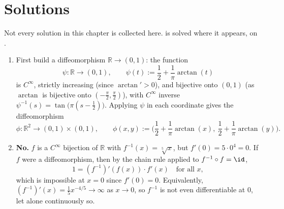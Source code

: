 
\section{Solutions}
\label{sec:ift_solutions}

Not every solution in this chapter is collected here.  is solved
where it appears, on .

\begin{exercisesolution}
\label{sol:diffeomorphism_properties}
\begin{enumerate}[label=\textbf{(\alph*)}]
  \item First build a diffeomorphism $\mathbb{R} \to (0,1)$: the function
    \[\psi : \mathbb{R} \to (0,1), \qquad \psi(t) := \frac12+\frac1\pi\arctan(t)\]
    is $C^\infty$, strictly increasing (since $\arctan' > 0$), and bijective onto $(0,1)$ (as
    $\arctan$ is bijective onto $(-\tfrac\pi2,\tfrac\pi2)$), with $C^\infty$ inverse
    $\psi^{-1}(s) = \tan\big(\pi(s-\tfrac12)\big)$. Applying $\psi$ in each coordinate gives the
    diffeomorphism
    \[\phi : \mathbb{R}^2 \to (0,1)\times(0,1), \qquad \phi(x,y) := \Big(\frac12+\frac1\pi\arctan(x),\ \frac12+\frac1\pi\arctan(y)\Big).\]
  \item \textbf{No.} $f$ is a $C^\infty$ bijection of $\mathbb{R}$ with $f^{-1}(x) =
    \sqrt[5]{x}$, but $f'(0) = 5\cdot0^4 = 0$. If $f$ were a diffeomorphism, then by the
    chain rule applied to $f^{-1}\circ f = \id$,
    \[1 = (f^{-1})'(f(x))\cdot f'(x) \quad \text{for all } x,\]
    which is impossible at $x=0$ since $f'(0)=0$. Equivalently, $(f^{-1})'(x) =
    \tfrac15x^{-4/5} \to \infty$ as $x \to 0$, so $f^{-1}$ is not even differentiable at $0$,
    let alone continuously so.
\end{enumerate}
\end{exercisesolution}

